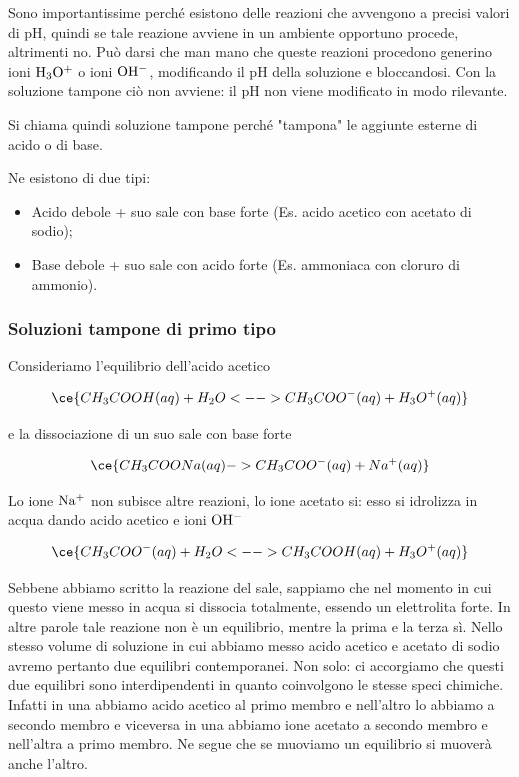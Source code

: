 Sono importantissime perché esistono delle reazioni che avvengono a precisi valori di pH, quindi se tale reazione avviene in un ambiente opportuno procede, altrimenti no. Può darsi che man mano che queste reazioni procedono generino ioni $\rm H_3O^+$ o ioni $\rm OH^-$, modificando il pH della soluzione e bloccandosi. Con la soluzione tampone ciò non avviene: il pH non viene modificato in modo rilevante.

Si chiama quindi soluzione tampone perché "tampona" le aggiunte esterne di acido o di base.

Ne esistono di due tipi:

\begin{itemize}
    \item Acido debole + suo sale con base forte
    (Es. acido acetico con acetato di sodio);
    \item Base debole + suo sale con acido forte
    (Es. ammoniaca con cloruro di ammonio).
\end{itemize}

\subsubsection{Soluzioni tampone di primo tipo}
Consideriamo l'equilibrio dell'acido acetico

$$\ce{CH_3COOH(aq) + H_2O <--> CH_3COO^-(aq) + H_3O^+(aq)}$$

e la dissociazione di un suo sale con base forte

$$\ce{CH_3COONa(aq) -> CH_3COO^-(aq) + Na^+(aq)}$$

Lo ione $\rm Na^+$ non subisce altre reazioni, lo ione acetato si: esso si idrolizza in acqua dando acido acetico e ioni $\rm OH^-$

$$\ce{CH_3COO^-(aq) + H_2O <--> CH_3COOH(aq) + H_3O^+(aq)}$$

Sebbene abbiamo scritto la reazione del sale, sappiamo che  nel momento in cui questo viene messo in acqua si dissocia totalmente, essendo un elettrolita forte. In altre parole tale reazione non è un equilibrio, mentre la prima e la terza sì. Nello stesso volume di soluzione in cui abbiamo messo acido acetico e acetato di sodio avremo pertanto due equilibri contemporanei. Non solo: ci accorgiamo che questi due equilibri sono interdipendenti in quanto coinvolgono le stesse speci chimiche. Infatti in una abbiamo acido acetico al primo membro e nell'altro lo abbiamo a secondo membro e viceversa in una abbiamo ione acetato a secondo membro e nell'altra a primo membro. Ne segue che se muoviamo un equilibrio si muoverà anche l'altro.

